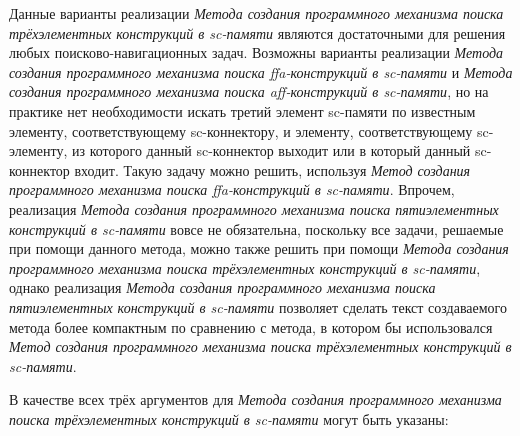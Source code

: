 \begin{SCn}
\begin{scnsubstruct}
\begin{scnsubstruct}
\end{scnsubstruct}

\end{scnsubstruct}
\end{SCn}

Данные варианты реализации \textit{Метода создания программного механизма поиска трёхэлементных конструкций в sc-памяти} являются достаточными для решения любых поисково-навигационных задач. Возможны варианты реализации \textit{Метода создания программного механизма поиска ffa-конструкций в sc-памяти} и \textit{Метода создания программного механизма поиска aff-конструкций в sc-памяти}, но на практике нет необходимости искать третий элемент sc-памяти по известным элементу, соответствующему sc-коннектору, и элементу, соответствующему sc-элементу, из которого данный sc-коннектор выходит или в который данный sc-коннектор входит. Такую задачу можно решить, используя \textit{Метод создания программного механизма поиска ffa-конструкций в sc-памяти}. Впрочем, реализация \textit{Метода создания программного механизма поиска пятиэлементных конструкций в sc-памяти} вовсе не обязательна, поскольку все задачи, решаемые при помощи данного метода, можно также решить при помощи \textit{Метода создания программного механизма поиска трёхэлементных конструкций в sc-памяти}, однако реализация \textit{Метода создания программного механизма поиска пятиэлементных конструкций в sc-памяти} позволяет сделать текст создаваемого метода более компактным по сравнению с метода, в котором бы использовался \textit{Метод создания программного механизма поиска трёхэлементных конструкций в sc-памяти}. 

В качестве всех трёх аргументов для \textit{Метода создания программного механизма поиска трёхэлементных конструкций в sc-памяти} могут быть указаны:

